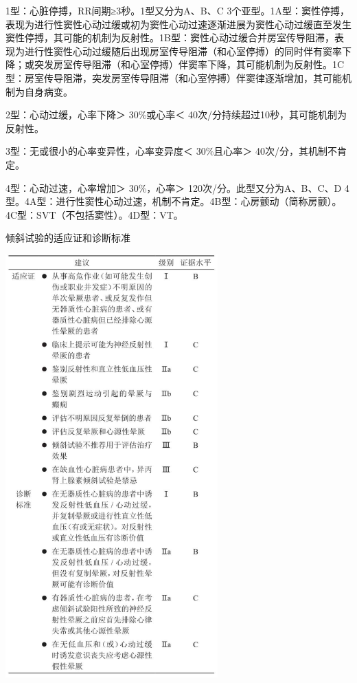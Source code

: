 1型：心脏停搏，RR间期≥3秒。1型又分为A、B、C
3个亚型。1A型：窦性停搏，表现为进行性窦性心动过缓或初为窦性心动过速逐渐进展为窦性心动过缓直至发生窦性停搏，其可能的机制为反射性。1B型：窦性心动过缓合并房室传导阻滞，表现为进行性窦性心动过缓随后出现房室传导阻滞（和心室停搏）的同时伴有窦率下降；或突发房室传导阻滞（和心室停搏）伴窦率下降，其可能机制为反射性。1C型：房室传导阻滞，突发房室传导阻滞（和心室停搏）伴窦律逐渐增加，其可能机制为自身病变。

2型：心动过缓，心率下降＞ 30\%或心率＜
40次/分持续超过10秒，其可能机制为反射性。

3型：无或很小的心率变异性，心率变异度＜ 30\%且心率＞
40次/分，其机制不肯定。

4型：心动过速，心率增加＞ 30\%，心率＞ 120次/分。此型又分为A、B、C、D
4型。4A型：进行性窦性心动过速，机制不肯定。4B型：心房颤动（简称房颤）。4C型：SVT（不包括窦性）。4D型：VT。

\begin{table}[htbp]
\centering
\caption{倾斜试验的适应证和诊断标准}
\label{tab4-5}
\includegraphics[width=3.21875in,height=6.40625in]{./images/Image00022.jpg}
\end{table}

